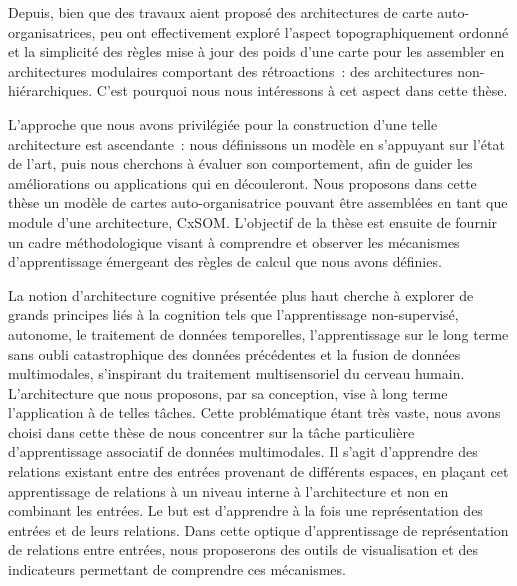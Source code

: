 Depuis, bien que des travaux aient proposé des architectures de carte auto-organisatrices, peu ont effectivement exploré l'aspect topographiquement ordonné et la simplicité des règles mise à jour des poids d'une carte pour les assembler en architectures modulaires comportant des rétroactions~: des architectures non-hiérarchiques. C'est pourquoi nous nous intéressons à cet aspect dans cette thèse.

L'approche que nous avons privilégiée pour la construction d'une telle architecture est ascendante~: nous définissons un modèle en s'appuyant sur l'état de l'art, puis nous cherchons à évaluer son comportement, afin de guider les améliorations ou applications qui en découleront.
Nous proposons dans cette thèse un modèle de cartes auto-organisatrice pouvant être assemblées en tant que module d'une architecture, CxSOM. L'objectif de la thèse est ensuite de fournir un cadre méthodologique visant à comprendre et observer les mécanismes d'apprentissage émergeant des règles de calcul que nous avons définies.

La notion d'architecture cognitive présentée plus haut cherche à explorer de grands principes liés à la cognition tels que l'apprentissage non-supervisé, autonome, le traitement de données temporelles, l'apprentissage sur le long terme sans oubli catastrophique des données précédentes et la fusion de données multimodales, s'inspirant du traitement multisensoriel du cerveau humain.
L'architecture que nous proposons, par sa conception, vise à long terme l'application à de telles tâches. Cette problématique étant très vaste, nous avons choisi dans cette thèse de nous concentrer sur la tâche particulière d'apprentissage associatif de données multimodales. 
Il s'agit d'apprendre des relations existant entre des entrées provenant de différents espaces, en plaçant cet apprentissage de relations à un niveau interne à l'architecture et non en combinant les entrées. Le but est d'apprendre à la fois une représentation des entrées et de leurs relations.
Dans cette optique d'apprentissage de représentation de relations entre entrées, nous proposerons des outils de visualisation et des indicateurs permettant de comprendre ces mécanismes.


